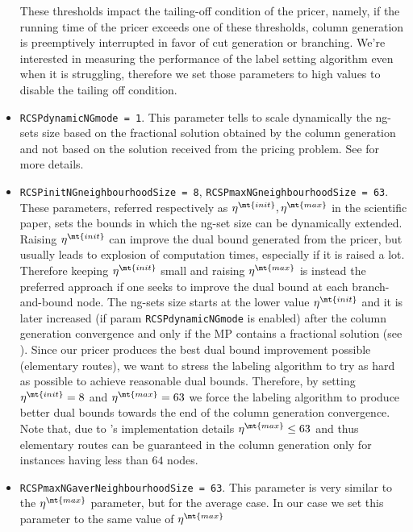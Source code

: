 \begin{itemize}
	      These thresholds impact the tailing-off condition of the pricer, namely, if the running time of the pricer exceeds one of these thresholds, column generation is preemptively interrupted in favor of cut generation or branching.
	      We're interested in measuring the performance of the label setting algorithm even when it is struggling, therefore we set those parameters to high values to disable the tailing off condition.
	\item \texttt{RCSPdynamicNGmode = 1}.
	      This parameter tells \bapcod{} to scale dynamically
	      the ng-sets size based on the
	      fractional solution obtained by the column generation
	      and not based on the solution received from the pricing problem.
	      See \textcite{pessoa2020generic} for more details.
	\item \texttt{RCSPinitNGneighbourhoodSize = 8}, \texttt{RCSPmaxNGneighbourhoodSize = 63}.
	      These parameters, referred respectively as $\eta^\mt{init}, \eta^\mt{max}$ in the scientific paper,
	      sets the bounds in which the ng-set size can be dynamically extended.
	      Raising $\eta^\mt{init}$ can improve the dual bound generated from the pricer, but usually leads to explosion of computation times, especially if it is raised a lot.
	      Therefore keeping $\eta^\mt{init}$ small and raising $\eta^\mt{max}$ is instead the preferred approach if one seeks to improve the dual bound at each branch-and-bound node.
	      The ng-sets size starts at the lower value $\eta^\mt{init}$ and it is later increased (if param \texttt{RCSPdynamicNGmode} is enabled)
	      after the column generation convergence and only if the MP contains a fractional solution (see \cite{pessoa2020generic}).
	      Since our pricer produces the best dual bound improvement possible (elementary routes),
	      we want to stress the labeling algorithm to try as hard as possible to achieve
	      reasonable dual bounds.
	      Therefore, by setting $\eta^\mt{init} = 8$ and $\eta^\mt{max} = 63$
	      we force the labeling algorithm to produce better dual bounds towards the end of the column generation convergence.
	      Note that, due to \bapcod{}'s implementation details $\eta^\mt{max} \le 63$ and thus
	      elementary routes can be guaranteed in the column generation
	      only for instances having less than $64$ nodes.
	\item \texttt{RCSPmaxNGaverNeighbourhoodSize = 63}.
	      This parameter is very similar to the $\eta^\mt{max}$ parameter, but for the average case.
	      In our case we set this parameter to the same value of $\eta^\mt{max}$

\end{itemize}
